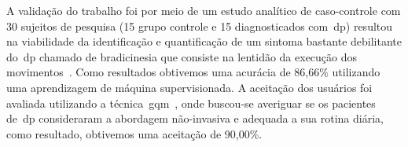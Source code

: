 



A validação do trabalho foi por meio de um estudo analítico de caso-controle com 30 sujeitos de pesquisa (15 grupo controle e 15 diagnosticados com~\ac{dp}) resultou na viabilidade da identificação e quantificação de um sintoma bastante debilitante do~\ac{dp} chamado de bradicinesia que consiste na lentidão da execução dos movimentos~\cite{protpar010}. Como resultados obtivemos uma acurácia de 86,66\%  utilizando uma aprendizagem de máquina supervisionada. A aceitação dos usuários foi avaliada utilizando a técnica~\ac{gqm}~\cite{van1999goal}, onde buscou-se averiguar se os pacientes de~\ac{dp} consideraram a abordagem não-invasiva e adequada a sua rotina diária, como resultado, obtivemos uma aceitação de 90,00\%.










